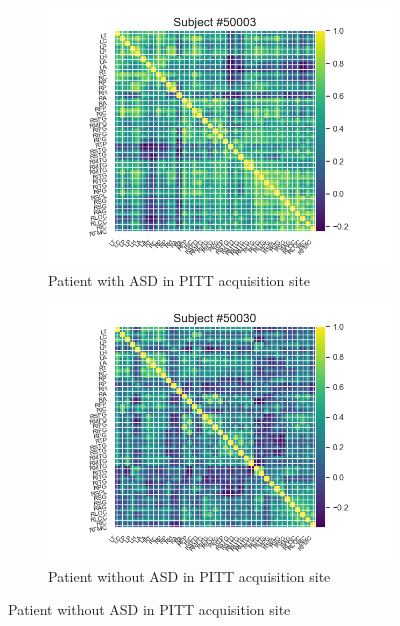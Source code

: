 \begin{figure}[h!]
    \begin{subfigure}{0.3\textwidth}
        \centering
        \includegraphics[width=\textwidth]{figures/ex_connectivity_matrix_pitt_ASD.png}
        \caption{\centering Patient with ASD in PITT acquisition site} 
        \Description{}
    \end{subfigure}
    \hfill
    \begin{subfigure}{0.3\textwidth}
        \centering
        \includegraphics[width=\textwidth]{figures/ex_connectivity_matrix_pitt_H.png}
        \caption{\centering Patient without ASD in PITT acquisition site} 
        \Description{}
    \end{subfigure}

\end{figure}
